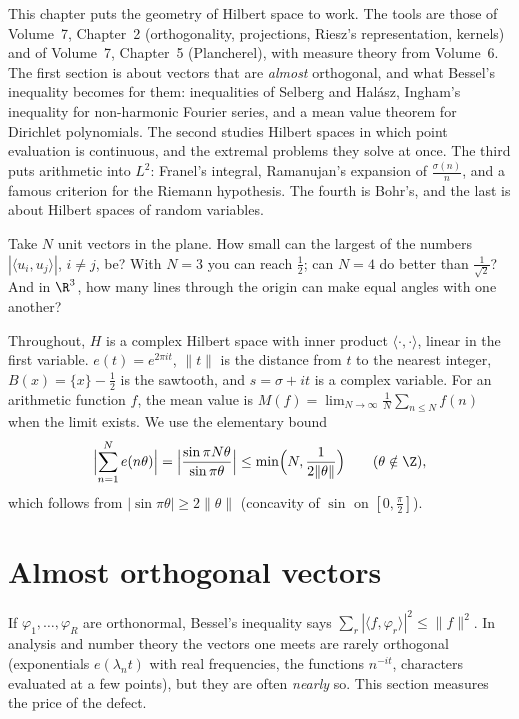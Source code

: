 This chapter puts the geometry of Hilbert space to work. The tools are those of Volume~7, Chapter~2 (orthogonality, projections,
Riesz's representation, kernels) and of Volume~7, Chapter~5 (Plancherel), with measure theory from Volume~6. The first section is about
vectors that are \emph{almost} orthogonal, and what Bessel's inequality becomes for them: inequalities of Selberg and Halász,
Ingham's inequality for non-harmonic Fourier series, and a mean value theorem for Dirichlet polynomials. The second studies Hilbert
spaces in which point evaluation is continuous, and the extremal problems they solve at once. The third puts arithmetic into
$L^2$: Franel's integral, Ramanujan's expansion of $\frac{\sigma(n)}n$, and a famous criterion for the Riemann hypothesis. The fourth
is Bohr's, and the last is about Hilbert spaces of random variables.

\begin{think}
Take $N$ unit vectors in the plane. How small can the largest of the numbers $|\langle u_i,u_j\rangle|$, $i\ne j$, be? With $N=3$
you can reach $\frac12$; can $N=4$ do better than $\frac1{\sqrt2}$? And in $\R^3$, how many lines through the origin can make equal
angles with one another?
\end{think}

Throughout, $H$ is a complex Hilbert space with inner product $\langle\cdot,\cdot\rangle$, linear in the first variable. $e(t)=e^{2\pi it}$,
$\|t\|$ is the distance from $t$ to the nearest integer, $B(x)=\{x\}-\frac12$ is the sawtooth, and $s=\sigma+it$ is a complex variable.
For an arithmetic function $f$, the mean value is $M(f)=\lim_{N\to\infty}\frac1N\sum_{n\le N}f(n)$ when the limit exists. We use the
elementary bound
\begin{equation}\label{eq:dirichletkernel}
\Bigl|\sum_{n=1}^Ne(n\theta)\Bigr|=\Bigl|\frac{\sin\pi N\theta}{\sin\pi\theta}\Bigr|\le\min\Bigl(N,\frac1{2\|\theta\|}\Bigr)\qquad(\theta\notin\Z),
\end{equation}
which follows from $|\sin\pi\theta|\ge2\|\theta\|$ (concavity of $\sin$ on $[0,\frac\pi2]$).

\section{Almost orthogonal vectors}

If $\varphi_1,\dots,\varphi_R$ are orthonormal, Bessel's inequality says $\sum_r|\langle f,\varphi_r\rangle|^2\le\|f\|^2$. In analysis and
number theory the vectors one meets are rarely orthogonal (exponentials $e(\lambda_nt)$ with real frequencies, the functions $n^{-it}$,
characters evaluated at a few points), but they are often \emph{nearly} so. This section measures the price of the defect.

